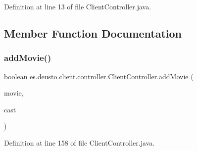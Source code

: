 Definition at line 13 of file Client\+Controller.\+java.



\subsection{Member Function Documentation}
\mbox{\label{classes_1_1deusto_1_1client_1_1controller_1_1_client_controller_a095a09ed143856ea25f51749de71f279}} 
\subsubsection{\texorpdfstring{addMovie()}{addMovie()}}
{\footnotesize\ttfamily boolean es.\+deusto.\+client.\+controller.\+Client\+Controller.\+add\+Movie (\begin{DoxyParamCaption}\item[{\mbox{\hyperlink{classes_1_1deusto_1_1server_1_1data_1_1_movie_d_t_o}{Movie\+D\+TO}}}]{movie,  }\item[{String \mbox{[}$\,$\mbox{]}}]{cast }\end{DoxyParamCaption})}



Definition at line 158 of file Client\+Controller.\+java.

